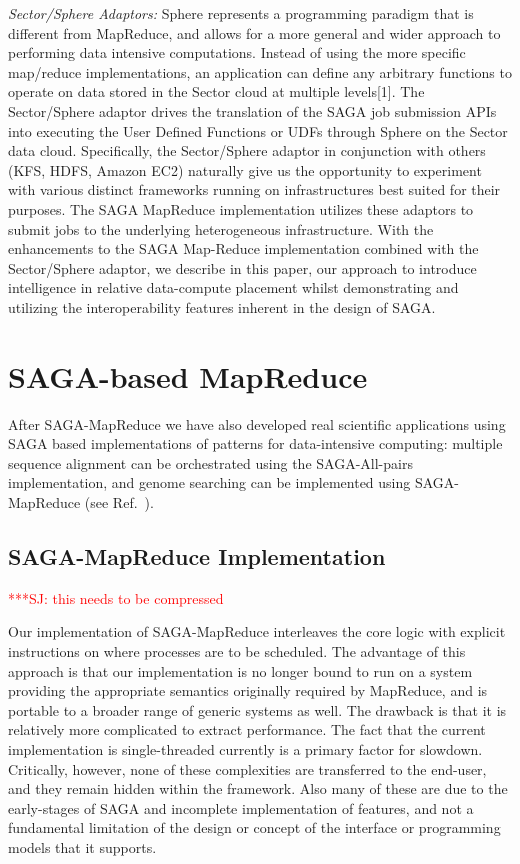 \documentclass[conference,final]{IEEEtran}
\newcommand{\jhanote}[1]{ {\textcolor{red} { ***SJ: #1 }}}
\newcommand{\jhanote}[1]{}
\newcommand{\sagamapreduce }{SAGA-MapReduce }
\newcommand{\upup}{\vspace*{-0.6em}}
\begin{document}
{\it Sector/Sphere Adaptors: }Sphere represents a programming paradigm
that is different from MapReduce, and allows for a more general and
wider approach to performing data intensive computations. Instead of
using the more specific map/reduce implementations, an application can
define any arbitrary functions to operate on data stored in the Sector
cloud at multiple levels[1]. The Sector/Sphere adaptor drives the
translation of the SAGA job submission APIs into executing the User
Defined Functions or UDFs through Sphere on the Sector data cloud.
Specifically, the Sector/Sphere adaptor in conjunction with others
(KFS, HDFS, Amazon EC2) naturally give us the opportunity to
experiment with various distinct frameworks running on infrastructures
best suited for their purposes. The SAGA MapReduce implementation
utilizes these adaptors to submit jobs to the underlying heterogeneous
infrastructure. With the enhancements to the SAGA Map-Reduce
implementation combined with the Sector/Sphere adaptor, we describe in
this paper, our approach to introduce intelligence in relative
data-compute placement whilst demonstrating and utilizing the
interoperability features inherent in the design of SAGA.

\section{SAGA-based MapReduce}
After \sagamapreduce we have also developed real scientific
applications using SAGA based implementations of patterns for
data-intensive computing: multiple sequence alignment can be
orchestrated using the SAGA-All-pairs implementation, and genome
searching can be implemented using SAGA-MapReduce (see
Ref.~\cite{saga_ccgrid09}).


\upup
\subsection{\sagamapreduce Implementation}


\jhanote{this needs to be compressed}

Our implementation of \sagamapreduce interleaves the core logic with
explicit instructions on where processes are to be scheduled.  The
advantage of this approach is that our implementation is no longer
bound to run on a system providing the appropriate semantics
originally required by MapReduce, and is portable to a broader range
of generic systems as well.  The drawback is that it is relatively
more complicated to extract performance.%
The fact that the current implementation is single-threaded
currently is a primary factor for slowdown.  Critically, however, none
of these complexities are transferred to the end-user, and they remain
hidden within the framework. Also many of these are due to the
early-stages of SAGA and incomplete implementation of features, and
not a fundamental limitation of the design or concept of the interface
or programming models that it supports.
\end{document}
